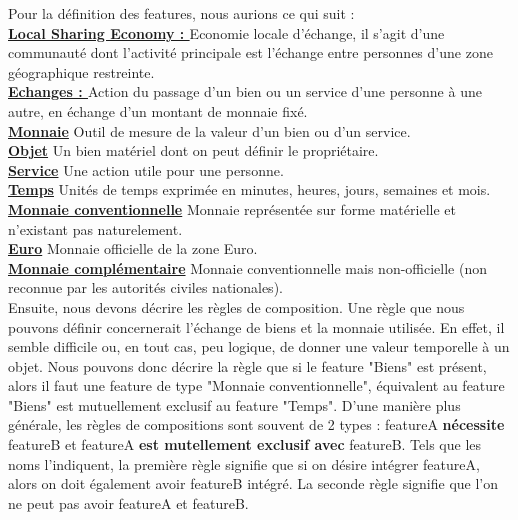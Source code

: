Pour la définition des features,  nous aurions ce qui suit : \\
\textbf{\underline{Local Sharing Economy : }} Economie locale d'échange,  il s'agit d'une communauté dont l'activité principale est l'échange entre personnes d'une zone géographique restreinte. \\
\textbf{\underline{Echanges : }} Action du passage d'un bien ou un service d'une personne à une autre,  en échange d'un montant de monnaie fixé.\\
\textbf{\underline{Monnaie}} Outil de mesure de la valeur d'un bien ou d'un service. \\
\textbf{\underline{Objet}} Un bien matériel dont on peut définir le propriétaire. \\
\textbf{\underline{Service}} Une action utile pour une personne. \\
\textbf{\underline{Temps}} Unités de temps exprimée en minutes, heures,  jours,  semaines et mois.  \\
\textbf{\underline{Monnaie conventionnelle}} Monnaie représentée sur forme matérielle et n'existant pas naturelement. \\
\textbf{\underline{Euro}} Monnaie officielle de la zone Euro. \\
\textbf{\underline{Monnaie complémentaire}} Monnaie conventionnelle mais non-officielle (non reconnue par les autorités civiles nationales). \\


Ensuite,  nous devons décrire les règles de composition.  Une règle que nous pouvons définir concernerait l'échange de biens et la monnaie utilisée.  En effet,  il semble difficile ou,  en tout cas,  peu logique,  de donner une valeur temporelle à un objet.  Nous pouvons donc décrire la règle que si le feature "Biens" est présent,  alors il faut une feature de type "Monnaie conventionnelle",  équivalent au feature "Biens" est mutuellement exclusif au feature "Temps".  D'une manière plus générale,  les règles de compositions sont souvent de 2 types : featureA \textbf{nécessite} featureB et featureA \textbf{est mutellement exclusif avec} featureB.  Tels que les noms l'indiquent,  la première règle signifie que si on désire intégrer featureA,  alors on doit également avoir featureB intégré.  La seconde règle signifie que l'on ne peut pas avoir featureA et featureB. 


